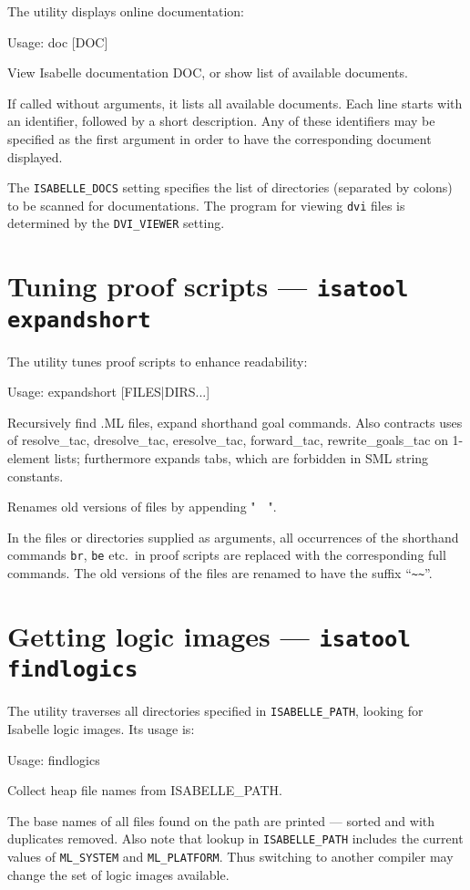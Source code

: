 The  utility displays online documentation:
\begin{ttbox}
Usage: doc [DOC]

  View Isabelle documentation DOC, or show list of available documents.
\end{ttbox}
If called without arguments, it lists all available documents. Each line
starts with an identifier, followed by a short description. Any of these
identifiers may be specified as the first argument in order to have the
corresponding document displayed.

\medskip The \texttt{ISABELLE_DOCS} setting specifies the list of directories
(separated by colons) to be scanned for documentations.  The program for
viewing \texttt{dvi} files is determined by the \texttt{DVI_VIEWER} setting.


\section{Tuning proof scripts --- \texttt{isatool expandshort}}

The  utility tunes {\ML} proof scripts to enhance
readability:
\begin{ttbox}
Usage: expandshort [FILES|DIRS...]

  Recursively find .ML files, expand shorthand goal commands.  Also
  contracts uses of resolve_tac, dresolve_tac, eresolve_tac,
  forward_tac, rewrite_goals_tac on 1-element lists; furthermore
  expands tabs, which are forbidden in SML string constants.

  Renames old versions of files by appending "~~".
\end{ttbox}
In the files or directories supplied as arguments, all occurrences of the
shorthand commands \texttt{br}, \texttt{be} etc.\ in proof scripts are
replaced with the corresponding full commands.  The old versions of the files
are renamed to have the suffix ``\verb'~~'''.


\section{Getting logic images --- \texttt{isatool findlogics}}

The  utility traverses all directories specified in
\texttt{ISABELLE_PATH}, looking for Isabelle logic images. Its usage is:
\begin{ttbox}
Usage: findlogics

  Collect heap file names from ISABELLE_PATH.
\end{ttbox}
The base names of all files found on the path are printed --- sorted and with
duplicates removed. Also note that lookup in \texttt{ISABELLE_PATH} includes
the current values of \texttt{ML_SYSTEM} and \texttt{ML_PLATFORM}. Thus
switching to another {\ML} compiler may change the set of logic images
available.


